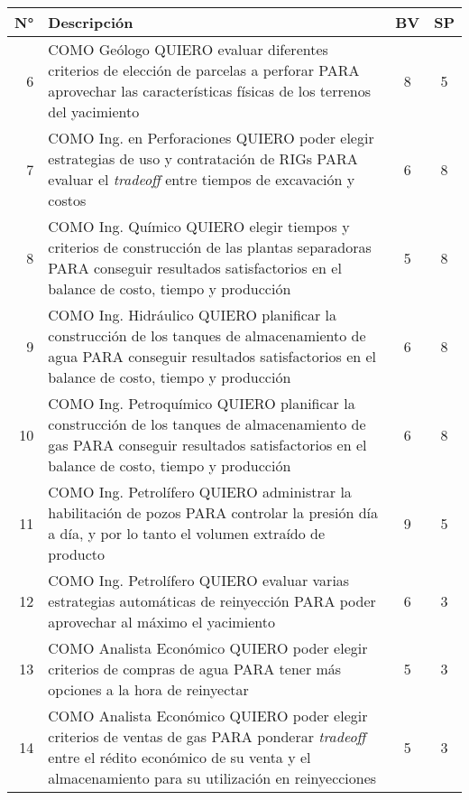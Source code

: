\begin{center}
  \begin{tabular}{| r | p{13cm} | c | c | }
    \hline
    N° & Descripción & BV & SP\\  \hline

    6 & COMO Geólogo QUIERO evaluar diferentes criterios de elección de parcelas a perforar PARA aprovechar las características físicas de los terrenos del yacimiento & 8 & 5\\  \hline

    7 & COMO Ing. en Perforaciones QUIERO poder elegir estrategias de uso y contratación de RIGs PARA evaluar el \textit{tradeoff} entre tiempos de excavación y costos & 6 & 8\\ \hline

    8 & COMO Ing. Químico QUIERO elegir tiempos y criterios de construcción de las plantas separadoras PARA conseguir resultados satisfactorios en el balance de costo, tiempo y producción & 5 & 8\\ \hline

    9 & COMO Ing. Hidráulico QUIERO planificar la construcción de los tanques de almacenamiento de agua PARA conseguir resultados satisfactorios en el balance de costo, tiempo y producción & 6 & 8\\ \hline

    10 & COMO Ing. Petroquímico QUIERO planificar la construcción de los tanques de almacenamiento de gas PARA conseguir resultados satisfactorios en el balance de costo, tiempo y producción & 6 & 8\\ \hline
      
    11 & COMO Ing. Petrolífero QUIERO administrar la habilitación de pozos PARA controlar la presión día a día, y por lo tanto el volumen extraído de producto & 9 & 5\\ \hline

    12 & COMO Ing. Petrolífero QUIERO evaluar varias estrategias automáticas de reinyección PARA poder aprovechar al máximo el yacimiento & 6 & 3\\ \hline

    13 & COMO Analista Económico QUIERO poder elegir criterios de compras de agua PARA tener más opciones a la hora de reinyectar & 5 & 3\\ \hline

    14 & COMO Analista Económico QUIERO poder elegir criterios de ventas de gas PARA ponderar \textit{tradeoff} entre el rédito económico de su venta y el almacenamiento para su utilización en reinyecciones & 5 & 3\\ \hline


\end{tabular}
\end{center}
